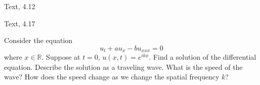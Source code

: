 \documentclass[minion]{homework}
\newcommand{\Reals}{\mathbb{R}}
\begin{document}
\begin{problems}

\problem  Text, 4.12

\problem Text, 4.17

\problem Consider the equation
\[
u_t + a u_{x} - b u_{xxx} = 0
\]
where $x\in \Reals$.  Suppose at $t=0$, $u(x,t)=e^{ikx}$.
Find a solution of the differential equation. Describe the
solution as a traveling wave.  What is the speed of the wave?
How does the speed change as we change the spatial frequency $k$?


\end{problems}
\end{document}
